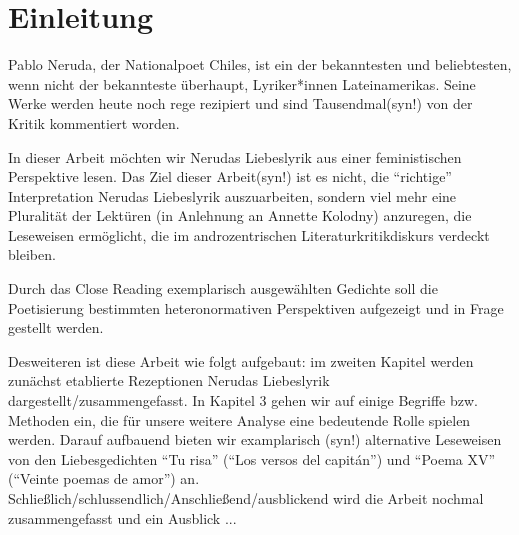 \section{Einleitung}

Pablo Neruda, der Nationalpoet Chiles, ist ein der bekanntesten und beliebtesten, wenn nicht der bekannteste überhaupt, Lyriker*innen Lateinamerikas.
Seine Werke werden heute noch rege rezipiert und sind Tausendmal(syn!) von der Kritik kommentiert worden.


In dieser Arbeit möchten wir Nerudas Liebeslyrik aus einer feministischen Perspektive lesen.
Das Ziel dieser Arbeit(syn!) ist es nicht, die ``richtige'' Interpretation Nerudas Liebeslyrik auszuarbeiten, sondern viel mehr eine Pluralität der Lektüren (in Anlehnung an Annette Kolodny) anzuregen, die Leseweisen ermöglicht, die im androzentrischen Literaturkritikdiskurs verdeckt bleiben.


Durch das Close Reading exemplarisch ausgewählten Gedichte soll die Poetisierung bestimmten heteronormativen Perspektiven aufgezeigt und in Frage gestellt werden.

Desweiteren ist diese Arbeit wie folgt aufgebaut: im zweiten Kapitel werden zunächst etablierte Rezeptionen Nerudas Liebeslyrik dargestellt/zusammengefasst.
In Kapitel 3 gehen wir auf einige Begriffe bzw. Methoden ein, die für unsere weitere Analyse eine bedeutende Rolle spielen werden.
Darauf aufbauend bieten wir examplarisch (syn!) alternative Leseweisen von den Liebesgedichten ``Tu risa'' (``Los versos del capitán'') und ``Poema XV'' (``Veinte poemas de amor'') an.
Schließlich/schlussendlich/Anschließend/ausblickend wird die Arbeit nochmal zusammengefasst und ein Ausblick ...

\begin{comment}
1. Intro
  * Ziel von Feministischen Lektüren: zugrunde liegende Machtstrukturen in Werken und deren Rezeption aufzudecken
    ** androzentrische Perspektive der Literatur:
       *** Männer in Mittelpunkt (als Figuren)
       *** von Männern gemacht
       *** an Männer gerichtet
  * Wie erreicht? Durch eine Pluralität der Lektüren und Close Reading
ohne das ouevre Nerudas nicht als ganzes in Frage stellen
exemplarische Lektüren: Poetisierung bestimmter Heteronormativen Perspektiven
gehört historisiert; nicht als zeitlos darzustellen
\end{comment}

